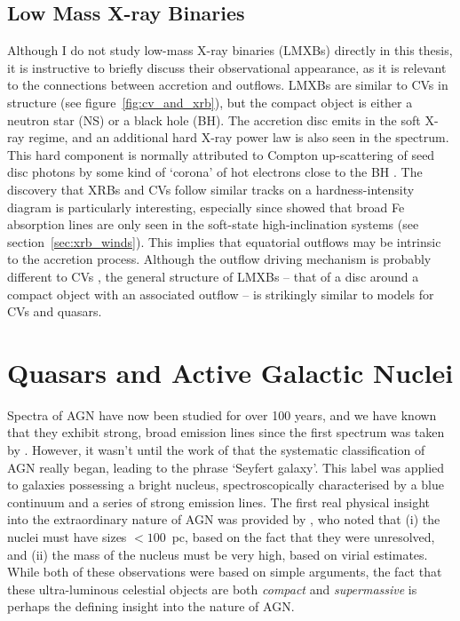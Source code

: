 \subsection{Low Mass X-ray Binaries}

Although I do not study low-mass X-ray binaries (LMXBs) 
directly in this thesis, it is instructive
to briefly discuss their observational appearance, 
as it is relevant to the connections between accretion and outflows.
LMXBs are similar to CVs in structure (see figure~\ref{fig:cv_and_xrb}), 
but the compact object is either a neutron star (NS) or a black hole (BH). 
The accretion disc 
emits in the soft X-ray regime, and an additional hard X-ray power law is also 
seen in the spectrum. This hard component is normally attributed
to Compton up-scattering of seed disc photons by some kind of `corona'
of hot electrons close to the BH \citep[e.g.][]{white1988,mitsuda1989,uttley2014}.
The discovery that XRBs and CVs follow similar 
tracks on a hardness-intensity diagram \citep[HID;][]{kordingDNjet2008}
is particularly interesting, especially since \cite{ponti2012}
showed that broad Fe absorption lines are only seen in the soft-state 
high-inclination systems (see section~\ref{sec:xrb_winds}). 
This implies that equatorial outflows may be intrinsic to 
the accretion process. Although the outflow driving mechanism
is probably different to CVs \citep[e.g.][]{diaztrigo2015}, 
the general structure of LMXBs -- that of a disc around a compact object with
an associated outflow -- is strikingly similar to models for CVs and quasars.




\section{Quasars and Active Galactic Nuclei}

Spectra of AGN have now been studied for over 100 years, and we have known 
that they exhibit strong, broad emission lines since the first spectrum was taken by
\cite{fath1909}. However, it wasn't until the work of \cite{seyfert1943} that the systematic 
classification of AGN really began, leading to the phrase `Seyfert galaxy'.
This label was applied to galaxies possessing a bright nucleus, spectroscopically
characterised by a blue continuum and a series of strong emission lines.
The first real physical insight into the extraordinary nature of AGN
was provided by \cite{woltjer1959}, who noted that 
(i) the nuclei must have sizes $<100$~pc,
based on the fact that they were unresolved, and (ii) the mass of the nucleus
must be very high, based on virial estimates. 
While both of these observations were based on simple arguments, the fact that these
ultra-luminous celestial objects are both {\em compact} and {\em supermassive}
is perhaps the defining insight into the nature of AGN.

